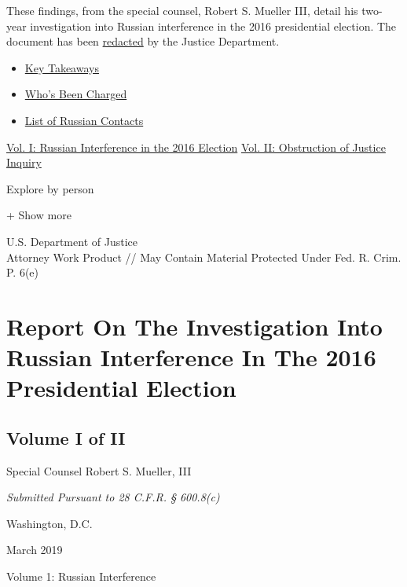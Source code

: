 These findings, from the special counsel, Robert S. Mueller III, detail
his two-year investigation into Russian interference in the 2016
presidential election. The document has been
\href{https://www.nytimes3xbfgragh.onion/2019/04/18/us/politics/redacted-mueller-report.html}{redacted}
by the Justice Department.

\begin{itemize}
\tightlist
\item
  \href{https://www.nytimes3xbfgragh.onion/2019/04/18/us/politics/mueller-report-pdf-takeaways.html}{Key
  Takeaways}
\item
  \href{https://www.nytimes3xbfgragh.onion/interactive/2018/08/21/us/mueller-trump-charges.html}{Who's
  Been Charged}
\item
  \href{https://www.nytimes3xbfgragh.onion/interactive/2019/01/26/us/politics/trump-contacts-russians-wikileaks.html}{List
  of Russian Contacts}
\end{itemize}

\protect\hyperlink{g-page-1}{Vol. I: Russian Interference in the 2016
Election} \protect\hyperlink{g-page-208}{Vol. II: Obstruction of Justice
Inquiry}

Explore by person

+ Show more

U.S. Department of Justice\\
Attorney Work Product // May Contain Material Protected Under Fed. R.
Crim. P. 6(e)

\hypertarget{report-on-the-investigation-into-russian-interference-in-the-2016-presidential-election}{%
\section{Report On The Investigation Into Russian Interference In The
2016 Presidential
Election}\label{report-on-the-investigation-into-russian-interference-in-the-2016-presidential-election}}

\hypertarget{volume-i-of-ii}{%
\subsection{Volume I of II}\label{volume-i-of-ii}}

Special Counsel Robert S. Mueller, III

\emph{Submitted Pursuant to 28 C.F.R. § 600.8(c)}

Washington, D.C.

March 2019

Volume 1: Russian Interference

